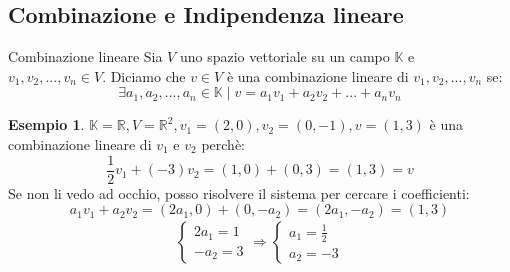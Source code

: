 \documentclass[a4paper]{article}
\theoremstyle{definition}
\newtheorem*{es}{Esempio}
\newtheorem*{prop}{Proposizione}
\begin{document}

\subsection{Combinazione e Indipendenza lineare}

\begin{deff}{Combinazione lineare}{}
	Sia $V$ uno spazio vettoriale su un campo $\mathbb{K}$ e $v_1, v_2, ..., v_n \in V$.
	Diciamo che $v \in V$ è una combinazione lineare di $v_1, v_2, ..., v_n$ se:
	\[ \exists a_1, a_2, ..., a_n \in \mathbb{K} \mid v = a_1v_1 + a_2v_2 + ... + a_nv_n \]
\end{deff}
\begin{es}
	$\mathbb{K} = \mathbb{R}, V = \mathbb{R}^2, v_1 = (2, 0), v_2 = (0, -1), v = (1, 3)$ è una combinazione lineare di $v_1$ e $v_2$ perchè:
	\[ \frac{1}{2}v_1 + (-3)v_2 = (1, 0) + (0, 3) = (1, 3) = v \]
	Se non li vedo ad occhio, posso risolvere il sistema per cercare i coefficienti:
	\[ a_1v_1 + a_2v_2 = (2a_1, 0) + (0, -a_2) = (2a_1, -a_2) = (1, 3) \]
	\begin{align*}
		\begin{cases}
			2a_1 = 1 \\
			-a_2 = 3
		\end{cases}
		\Rightarrow
		\begin{cases}
			a_1 = \frac{1}{2} \\
			a_2 = -3
		\end{cases}
	\end{align*}
\end{es}
\end{document}
